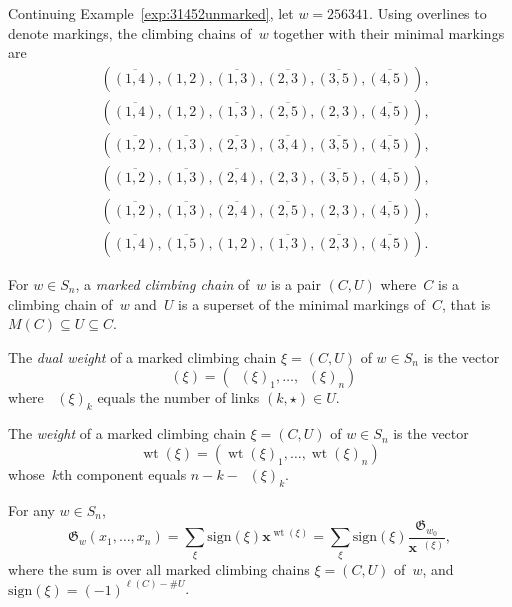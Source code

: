 \documentclass[ALCO]{cedram}
\DeclareMathOperator{\wt}{\mathrm{wt}}
\DeclareMathOperator{\dwt}{\overline{\mathrm{wt}}}
\begin{document}
\begin{example}
	\label{exp:31452marked}
	Continuing Example~\ref{exp:31452unmarked}, let $w=256341$. Using overlines to denote markings, the climbing chains of~$w$ together with their minimal markings are
	\begin{align*}
		&(\overline{(1,4)},{(1,2)},\overline{(1,3)},\overline{(2,3)},\overline{(3,5)},\overline{(4,5)}),\\
		&(\overline{(1,4)},{(1,2)},\overline{(1,3)},\overline{(2,5)},{(2,3)},\overline{(4,5)}),\\
		&(\overline{(1,2)},\overline{(1,3)},\overline{(2,3)},\overline{(3,4)},\overline{(3,5)},\overline{(4,5)}),\\
		&(\overline{(1,2)},\overline{(1,3)},\overline{(2,4)},{(2,3)},\overline{(3,5)},\overline{(4,5)}),\\
		&(\overline{(1,2)},\overline{(1,3)},\overline{(2,4)},\overline{(2,5)},{(2,3)},\overline{(4,5)}),\\
		&(\overline{(1,4)},\overline{(1,5)},{(1,2)},\overline{(1,3)},\overline{(2,3)},\overline{(4,5)}).
	\end{align*}
\end{example}

\begin{definition}
	For $w\in S_n$, a \emph{marked climbing chain} of~$w$ is a pair $(C,U)$ where~$C$ is a climbing chain of~$w$ and~$U$ is a superset of the minimal markings of~$C$, that is $M(C)\subseteq U\subseteq C$.
\end{definition}

\begin{definition}
	The \emph{dual weight} of a marked climbing chain $\xi=(C,U)$ of $w\in S_n$ is the vector \[\dwt(\xi)=(\dwt(\xi)_1,\ldots,\dwt(\xi)_n) \]
	where $\dwt(\xi)_k$ equals the number of links $(k,\star)\in U$.
\end{definition}

\begin{definition}
	The \emph{weight} of a marked climbing chain $\xi=(C,U)$ of $w\in S_n$ is the vector \[\wt(\xi)=(\wt(\xi)_1,\ldots,\wt(\xi)_n)\] whose~$k$th component equals $n-k-\dwt(\xi)_k$.
\end{definition}

\begin{theorem}
	\label{thm:grothformula}
	For any $w\in S_n$,
	\[\mathfrak{G}_w(x_1,\ldots,x_n) = \sum_{\xi} \mathrm{sign}(\xi) \bm{x}^{\wt(\xi)} =\sum_{\xi} \mathrm{sign}(\xi) \frac{\mathfrak{G}_{w_0}}{\bm{x}^{\dwt(\xi)}}, \]
	where the sum is over all marked climbing chains $\xi=(C,U)$ of~$w$, and $\mathrm{sign}(\xi) = (-1)^{\ell(C)-\#U}$.
\end{theorem}
\end{document}
